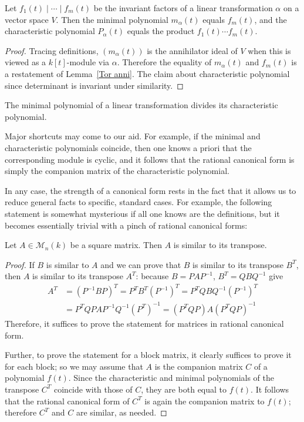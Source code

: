 \begin{proposition}\label{Mini chara poly}
Let $f_1(t)\mid\cdots\mid f_m(t)$ be the invariant factors of a linear transformation $\alpha$ on a vector space $V$. Then the minimal polynomial $m_\alpha(t)$ equals $f_m(t)$, and the characteristic polynomial $P_\alpha(t)$ equals the product $f_1(t)\cdots f_m(t)$.
\end{proposition}
\begin{proof}
Tracing definitions, $(m_\alpha(t))$ is the annihilator ideal of $V$ when this is viewed as a $k[t]$-module via $\alpha$. Therefore the equality of $m_\alpha(t)$ and $f_m(t)$ is a restatement of Lemma~\ref{Tor anni}. The claim about characteristic polynomial since determinant is invariant under similarity.
\end{proof}
\begin{corollary}
The minimal polynomial of a linear transformation divides its characteristic polynomial.
\end{corollary}
\begin{remark}
Major shortcuts may come to our aid. For example, if the minimal and characteristic polynomials coincide, then one knows a priori that the corresponding module is cyclic, and it follows that the rational canonical form is simply the companion matrix of the characteristic polynomial.
\end{remark}
In any case, the strength of a canonical form rests in the fact that it allows us to reduce general facts to specific, standard cases. For example, the following statement is somewhat mysterious if all one knows are the definitions, but it becomes essentially trivial with a pinch of rational canonical forms:
\begin{proposition}
Let $A\in\mathcal{M}_n(k)$ be a square matrix. Then $A$ is similar to its transpose.
\end{proposition}
\begin{proof}
If $B$ is similar to $A$ and we can prove that $B$ is similar to its transpose $B^T$, then $A$ is similar to its transpose $A^T$: because $B=PAP^{-1}$, $B^T=QBQ^{-1}$ give
\begin{align*}
A^T&=(P^{-1}BP)^{T}=P^TB^T(P^{-1})^T=P^TQBQ^{-1}(P^{-1})^T\\
&=P^TQPAP^{-1}Q^{-1}(P^T)^{-1}=(P^TQP)A(P^TQP)^{-1}
\end{align*}
Therefore, it suffices to prove the statement for matrices in rational canonical form.\par
Further, to prove the statement for a block matrix, it clearly suffices to prove it for each block; so we may assume that $A$ is the companion matrix $C$ of a polynomial $f(t)$. Since the characteristic and minimal polynomials of the transpose $C^T$ coincide with those of $C$, they are both equal to $f(t)$. It follows that the rational canonical form of $C^T$ is again the companion matrix to $f(t)$; therefore $C^T$ and $C$ are similar, as needed.
\end{proof}
